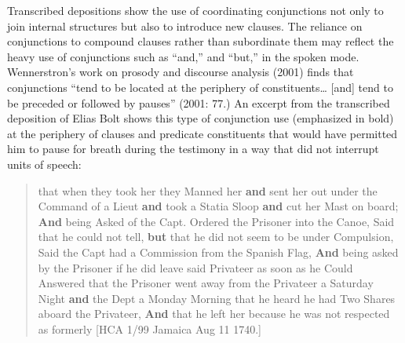Transcribed depositions show the use of coordinating conjunctions not only to join internal structures but also to introduce new clauses. The reliance on conjunctions to compound clauses rather than subordinate them may reflect the heavy use of conjunctions such as “and,” and “but,” in the spoken mode. Wennerstron’s work on prosody and discourse analysis (2001) finds that conjunctions “tend to be located at the periphery of constituents… [and] tend to be preceded or followed by pauses” (2001: 77.) An excerpt from the transcribed deposition of Elias Bolt shows this type of conjunction use (emphasized in bold) at the periphery of clauses and predicate constituents that would have permitted him to pause for breath during the testimony in a way that did not interrupt units of speech:

\begin{quotation}
that when they took her they Manned her \textbf{and} sent her out under the Command of a Lieut \textbf{and} took a Statia Sloop \textbf{and} cut her Mast on board; \textbf{And} being Asked of the Capt. Ordered the Prisoner into the Canoe, Said that he could not tell, \textbf{but} that he did not seem to be under Compulsion, Said the Capt had a Commission from the Spanish Flag, \textbf{And} being asked by the Prisoner if he did leave said Privateer as soon as he Could Answered that the Prisoner went away from the Privateer a Saturday Night \textbf{and} the Dept a Monday Morning that he heard he had Two Shares aboard the Privateer, \textbf{And} that he left her because he was not respected as formerly [HCA 1/99 Jamaica Aug 11 1740.]\end{quotation}

